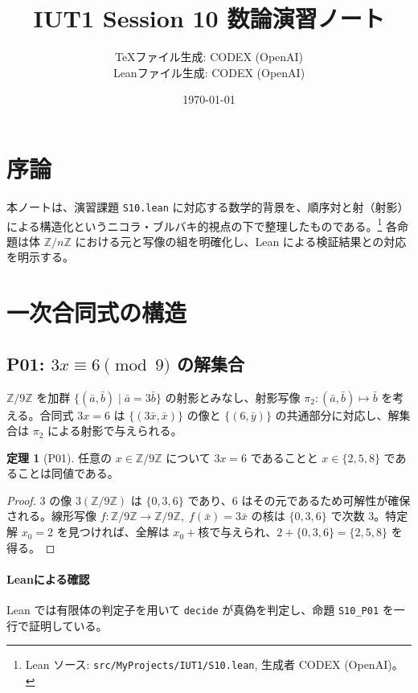 \documentclass{ltjsarticle}
\title{IUT1 Session 10 数論演習ノート}
\author{TeXファイル生成: CODEX (OpenAI)\\Leanファイル生成: CODEX (OpenAI)}
\date{\today}
\theoremstyle{definition}
\newtheorem{theorem}{定理}[section]
\begin{document}
\maketitle

\tableofcontents

\section{序論}
本ノートは、演習課題 \texttt{S10.lean} に対応する数学的背景を、順序対と射（射影）による構造化というニコラ・ブルバキ的視点の下で整理したものである。\footnote{Lean ソース: \texttt{src/MyProjects/IUT1/S10.lean}, 生成者 CODEX (OpenAI)。} 各命題は体 $\mathbb{Z}/n\mathbb{Z}$ における元と写像の組を明確化し、Lean による検証結果との対応を明示する。

\section{一次合同式の構造}
\subsection{P01: $3x \equiv 6 \pmod 9$ の解集合}
$\mathbb{Z}/9\mathbb{Z}$ を加群 $\{(\bar a, \bar b) \mid \bar a = 3\bar b\}$ の射影とみなし、射影写像 $\pi_2: (\bar a, \bar b) \mapsto \bar b$ を考える。合同式 $3x=6$ は $\{(3\bar x, \bar x)\}$ の像と $\{(6, \bar y)\}$ の共通部分に対応し、解集合は $\pi_2$ による射影で与えられる。

\begin{theorem}[P01]
任意の $x \in \mathbb{Z}/9\mathbb{Z}$ について $3x = 6$ であることと $x \in \{2,5,8\}$ であることは同値である。
\end{theorem}

\begin{proof}
$3$ の像 $3(\mathbb{Z}/9\mathbb{Z})$ は $\{0,3,6\}$ であり、$6$ はその元であるため可解性が確保される。線形写像 $f: \mathbb{Z}/9\mathbb{Z} \to \mathbb{Z}/9\mathbb{Z},\; f(\bar x)=3\bar x$ の核は $\{0,3,6\}$ で次数 $3$。特定解 $x_0=2$ を見つければ、全解は $x_0+$核で与えられ、$2+\{0,3,6\}=\{2,5,8\}$ を得る。
\end{proof}

\paragraph{Leanによる確認} Lean では有限体の判定子を用いて \verb|decide| が真偽を判定し、命題 \verb|S10_P01| を一行で証明している。
\end{document}
